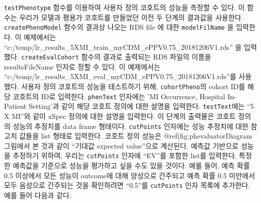 \documentclass[11pt]{book}
\theoremstyle{definition}
\theoremstyle{definition}
\theoremstyle{definition}
\theoremstyle{remark}
\begin{document}
\texttt{testPhenotype} 함수를 이용하여 사용자 정의 코호트의 성능을
측정할 수 있다. 이 함수는 우리가 모델과 평용가 코호트를 만들었던 이전 두
단계의 결과값을 사용한다. \texttt{createPhenoModel} 함수의 결과상 나오는
RDS file 에 대한 \texttt{modelFilName} 을 입력한다. 이 예제에서는
``c:/temp/lr\_results\_5XMI\_train\_myCDM\_ePPV0.75\_20181206V1.rds'' 을
입력했다. \texttt{createEvalCohort} 함수의 결과로 출력되는 RDS 파일의
이름을 resultsFileName 인자로 정할 수 있다. 이 예제에서는
``c:/temp/lr\_results\_5XMI\_eval\_myCDM\_ePPV0.75\_20181206V1.rds''를
사용했다. 사용자 정의 코호트의 성능을 테스트하기 위해,
\texttt{cohortPheno}의 cohort ID를 해당 코호트의 ID로 입력한다.
\texttt{phenText} 인자에는 'MI Occurrence, Hospital In-Patient
Setting'과 같이 해당 코호트 정의에 대한 설명을 입력한다.
\texttt{testText}에는 ``5 X MI''와 같이 xSpec 정의에 대한 설명을
입력한다. 이 단계의 출력물은 코호트 정의의 성능의 추정치를 data frame
형태이다. \texttt{cutPoints} 인자에는 성능 추정치에 대한 참고치 값들을
list 형태로 입력한다. 코호트 정의 성능은 @ref(fig:phevaluatorDiagram
그림에서 본 것과 같이 ``기대값 expected value''으로 계산된다. 예측값
기반으로 성능을 추정하기 위하여, 우리는 \texttt{cutPoints} 인자에
``EV''를 포함한 list를 입력한다. 특정한 예측값을 기준으로 성능을
평가하고 싶을 수도 있을 것이다. 예를 들어, 예측 확률 0.5 이상에서 모든
성능이 outcome에 대해 양성으로 간주되고 예측 확률 0.5 미만에서 모두
음성으로 간주되는 것을 확인하려면 ``0.5''를 \texttt{cutPoints} 인자
목록에 추가한다. 예를 들어 다음과 같다.
\end{document}

